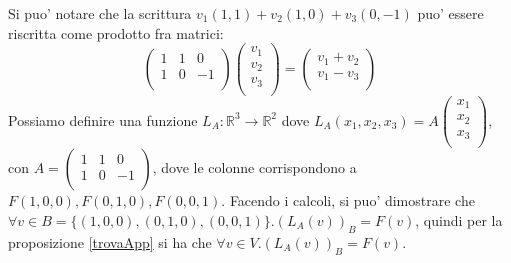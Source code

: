 \documentclass{report}
\begin{document}
Si puo' notare che la scrittura $ v_1(1,1) + v_2(1,0) + v_3(0,-1) $ puo' essere riscritta come prodotto fra matrici:
\[
\begin{pmatrix}
1 & 1 & 0\\
1 & 0 & -1\\
\end{pmatrix} 
\begin{pmatrix}
v_1\\
v_2\\
v_3\\
\end{pmatrix} = \begin{pmatrix}
v_1+v_2\\
v_1-v_3\\
\end{pmatrix}
\]
Possiamo definire una funzione $ L_A: \mathbb{R}^3\to\mathbb{R}^2 $ dove $ L_A(x_1,x_2,x_3) = A \begin{pmatrix}
x_1\\
x_2\\
x_3\\
\end{pmatrix} $, con $ A = \begin{pmatrix}
1 & 1 & 0\\
1 & 0 & -1\\
\end{pmatrix} $, dove le colonne corrispondono a $ F(1,0,0), F(0,1,0), F(0,0,1) $. Facendo i calcoli, si puo' dimostrare che $ \forall v \in B=\{(1,0,0),(0,1,0),(0,0,1)\}. (L_A(v))_B = F(v) $, quindi per la proposizione \ref{trovaApp} si ha che $ \forall v \in V. (L_A(v))_B = F(v) $.
\end{document}
